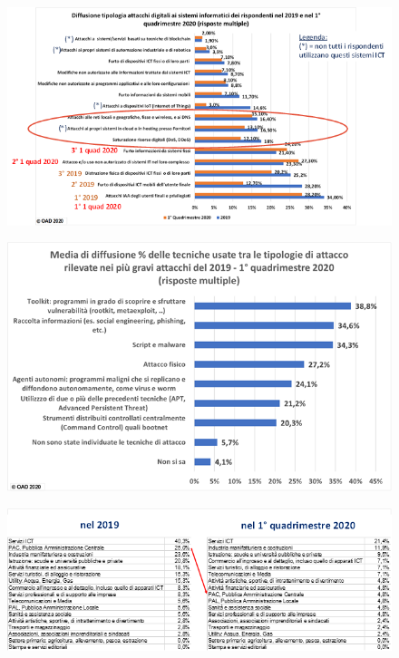 \documentclass{easychair}
\begin{document}
\begin{figure}
	\centering
		\includegraphics[width=1\textwidth]{pictures/fig5.png}
		\caption{}
		\label{fig:5}
\end{figure}
\begin{figure}
	\centering
		\includegraphics[width=1\textwidth]{pictures/fig6.png}
		\caption{}
		\label{fig:6}
\end{figure}
\begin{figure}
	\centering
		\includegraphics[width=1\textwidth]{pictures/fig7.png}
		\caption{}
		\label{fig:7}
\end{figure}
\end{document}

